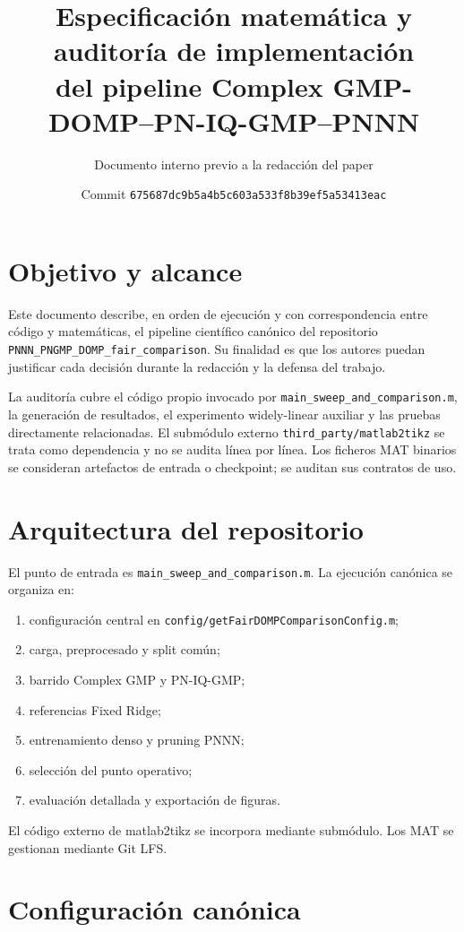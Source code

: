 \documentclass[10pt,a4paper]{article}
\title{Especificación matemática y auditoría de implementación\\
del pipeline Complex GMP-DOMP--PN-IQ-GMP--PNNN}
\author{Documento interno previo a la redacción del paper}
\date{Commit \texttt{675687dc9b5a4b5c603a533f8b39ef5a53413eac}}
\newcommand{\repo}{\texttt{PNNN\_PNGMP\_DOMP\_fair\_comparison}}
\newcommand{\code}[1]{\texttt{#1}}
\begin{document}
\maketitle
\tableofcontents
\newpage

\section{Objetivo y alcance}

Este documento describe, en orden de ejecución y con correspondencia entre
código y matemáticas, el pipeline científico canónico del repositorio \repo.
Su finalidad es que los autores puedan justificar cada decisión durante la
redacción y la defensa del trabajo.

La auditoría cubre el código propio invocado por
\code{main\_sweep\_and\_comparison.m}, la generación de resultados, el
experimento widely-linear auxiliar y las pruebas directamente relacionadas.
El submódulo externo \code{third\_party/matlab2tikz} se trata como dependencia
y no se audita línea por línea. Los ficheros MAT binarios se consideran
artefactos de entrada o checkpoint; se auditan sus contratos de uso.

\section{Arquitectura del repositorio}

El punto de entrada es \code{main\_sweep\_and\_comparison.m}. La ejecución
canónica se organiza en:

\begin{enumerate}[leftmargin=*]
\item configuración central en \code{config/getFairDOMPComparisonConfig.m};
\item carga, preprocesado y split común;
\item barrido Complex GMP y PN-IQ-GMP;
\item referencias Fixed Ridge;
\item entrenamiento denso y pruning PNNN;
\item selección del punto operativo;
\item evaluación detallada y exportación de figuras.
\end{enumerate}

El código externo de matlab2tikz se incorpora mediante submódulo. Los MAT se
gestionan mediante Git LFS.

\section{Configuración canónica}
\end{document}
